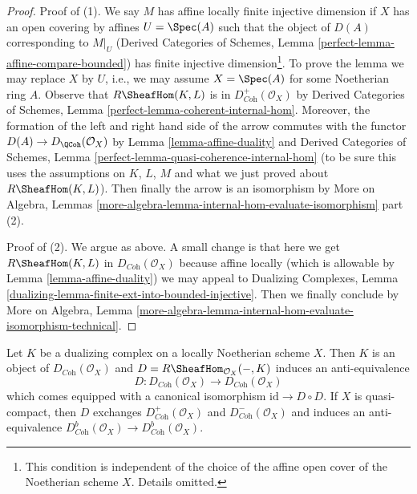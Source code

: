 \begin{proof}
Proof of (1). We say $M$ has affine locally finite injective dimension
if $X$ has an open covering by affines $U = \Spec(A)$ such that the object
of $D(A)$ corresponding to $M|_U$ (Derived Categories of Schemes, Lemma
\ref{perfect-lemma-affine-compare-bounded})
has finite injective dimension\footnote{This condition is independent of the
choice of the affine open cover of the Noetherian scheme $X$.
Details omitted.}. To prove the lemma we may
replace $X$ by $U$, i.e., we may assume $X = \Spec(A)$
for some Noetherian ring $A$. Observe that
$R\SheafHom(K, L)$ is in $D^+_{\textit{Coh}}(\mathcal{O}_X)$ by
Derived Categories of Schemes, Lemma
\ref{perfect-lemma-coherent-internal-hom}.
Moreover, the formation of the left and right hand side
of the arrow commutes with the functor $D(A) \to D_\QCoh(\mathcal{O}_X)$ by
Lemma \ref{lemma-affine-duality} and
Derived Categories of Schemes, Lemma
\ref{perfect-lemma-quasi-coherence-internal-hom}
(to be sure this uses the assumptions on $K$, $L$, $M$ and what we just
proved about $R\SheafHom(K, L)$).
Then finally the arrow is an isomorphism by
More on Algebra, Lemmas
\ref{more-algebra-lemma-internal-hom-evaluate-isomorphism} part (2).

\medskip\noindent
Proof of (2). We argue as above. A small change is that here we get
$R\SheafHom(K, L)$ in $D_{\textit{Coh}}(\mathcal{O}_X)$ because
affine locally (which is allowable by Lemma \ref{lemma-affine-duality})
we may appeal to Dualizing Complexes, Lemma
\ref{dualizing-lemma-finite-ext-into-bounded-injective}.
Then we finally conclude by
More on Algebra, Lemma
\ref{more-algebra-lemma-internal-hom-evaluate-isomorphism-technical}.
\end{proof}

\begin{lemma}
\label{lemma-dualizing-schemes}
Let $K$ be a dualizing complex on a locally Noetherian scheme $X$.
Then $K$ is an object of $D_{\textit{Coh}}(\mathcal{O}_X)$
and $D = R\SheafHom_{\mathcal{O}_X}(-, K)$ induces an anti-equivalence
$$
D :
D_{\textit{Coh}}(\mathcal{O}_X)
\longrightarrow
D_{\textit{Coh}}(\mathcal{O}_X)
$$
which comes equipped with a canonical isomorphism
$\text{id} \to D \circ D$. If $X$ is quasi-compact, then
$D$ exchanges $D^+_{\textit{Coh}}(\mathcal{O}_X)$ and
$D^-_{\textit{Coh}}(\mathcal{O}_X)$ and induces an anti-equivalence
$D^b_{\textit{Coh}}(\mathcal{O}_X) \to D^b_{\textit{Coh}}(\mathcal{O}_X)$.
\end{lemma}

